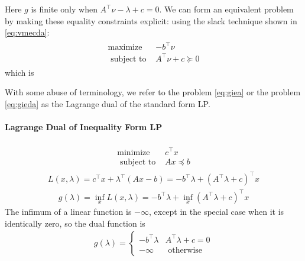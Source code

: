 \documentclass{article}
\begin{document}
Here $g$ is finite only when $A^{\top} \nu-\lambda+c=0$. We can form an equivalent problem by making these equality constraints explicit:
using the slack technique shown in \cref{eq:vmecda}:
\begin{align}
\begin{array}{ll}
\operatorname{maximize} & -b^{\top} \nu \\
\text { subject to } & A^{\top} \nu+c \succeq 0
\end{array}\label{eq:giea}
\end{align}
which is 
\begin{rema}
With some abuse of terminology, we refer to the problem \cref{eq:giea} or the problem \cref{eq:gieda} as the Lagrange dual of the standard form LP.
\end{rema} 

\paragraph{Lagrange Dual of Inequality Form LP}
\begin{align}
\begin{array}{ll}
\operatorname{minimize} & c^{\top} x \\
\text { subject to } & A x \preceq b
\end{array}\label{eq:gherf}
\end{align}
\begin{align*}
L(x, \lambda)=c^{\top} x+\lambda^{\top}(A x-b)=-b^{\top} \lambda+\left(A^{\top} \lambda+c\right)^{\top} x
\end{align*}
\begin{align*}
g(\lambda)=\inf _{x} L(x, \lambda)=-b^{\top} \lambda+\inf _{x}\left(A^{\top} \lambda+c\right)^{\top} x
\end{align*}
The infimum of a linear function is $-\infty$, except in the special case when it is identically zero, so the dual function is
\begin{align*}
g(\lambda)= \begin{cases}-b^{\top} \lambda & A^{\top} \lambda+c=0 \\ -\infty & \text { otherwise }\end{cases}
\end{align*}
\end{document}
